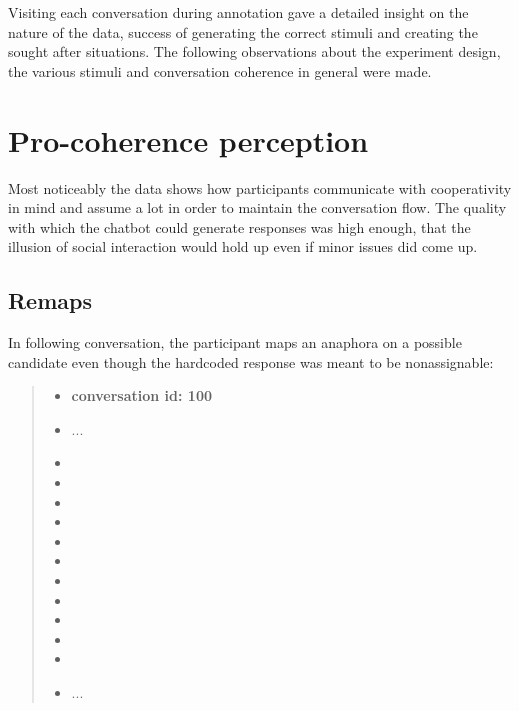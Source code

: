 Visiting each conversation during annotation
gave a detailed insight on the nature of the data,
success of generating the correct stimuli and
creating the sought after situations.
The following observations about
the experiment design, the various stimuli and conversation coherence in general
were made.

\section{Pro-coherence perception}

Most noticeably the data shows how participants communicate with cooperativity in mind
and assume a lot in order to maintain the conversation flow.
The quality with which the chatbot could generate responses was high enough,
that the illusion of social interaction would hold up even if minor issues did come up.

\subsection{Remaps}

In following conversation, the participant maps an anaphora on a possible candidate
even though the hardcoded response was meant to be nonassignable:

    \begin{quote}
    \begin{itemize}[label={}, leftmargin=0pt, itemsep=0.5em]
    \item \textbf{conversation id: 100}
    \item ...
    \item {}
    \item {}
    \item {}
    \item {}
    \item {}
    \item {}
    \item {}
    \item {}
    \item {}
    \item {}
    \item {}
    \item ...
    \end{itemize}
    \end{quote}

